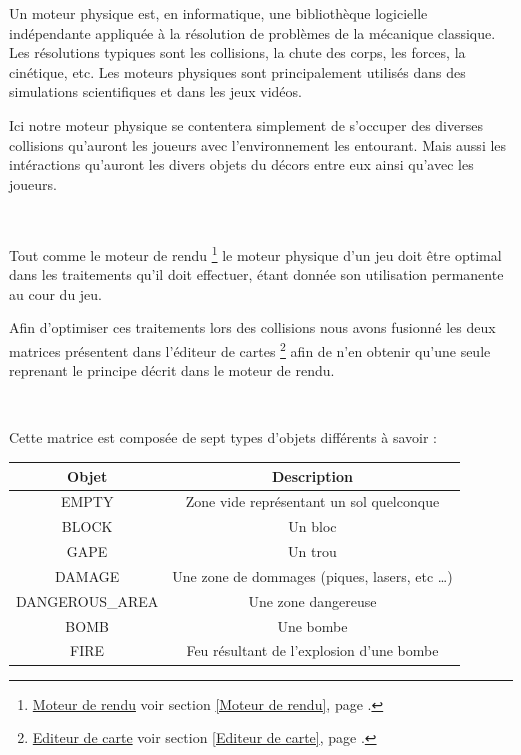 			\hypertarget{Moteur physique}{}
			\label{Moteur physique}
			
			Un moteur physique est, en informatique, une bibliothèque logicielle 
			indépendante appliquée à la résolution de problèmes de la mécanique
			classique.  Les résolutions typiques sont les collisions, la chute des corps,
			les forces, la cinétique, etc.
			Les moteurs physiques sont principalement utilisés dans des simulations 
			scientifiques et dans les jeux vidéos.
			
			
			Ici notre moteur physique se contentera simplement de s'occuper des diverses
			collisions qu'auront les joueurs avec l'environnement les entourant. Mais
			aussi les intéractions qu'auront les divers objets du décors entre eux
			ainsi qu'avec les joueurs.

			$\,$		
			
			Tout comme le moteur de rendu
			\footnote{
				\hyperlink{Moteur de rendu}{Moteur de rendu}
				\og voir section \ref{Moteur de rendu}, page \pageref{Moteur de rendu}.\fg
			}
			le moteur physique d'un jeu doit être optimal dans les traitements qu'il doit
			effectuer, étant donnée son utilisation permanente au cour du jeu.
			
			
			Afin d'optimiser ces traitements lors des collisions nous avons fusionné les
			deux matrices présentent dans l'éditeur de cartes
			\footnote{
				\hyperlink{Editeur de carte}{Editeur de carte}
				\og voir section \ref{Editeur de carte}, page \pageref{Editeur de carte}.\fg
			}
			afin de n'en obtenir qu'une seule reprenant le principe décrit dans le moteur
			de rendu\footnotemark[2].
			
			$\,$
			
			Cette matrice est composée de sept types d'objets différents à savoir :
			
			\begin{center}
				\begin{tabular}{|c|c|} \hline
				Objet  & Description \\\hline
				EMPTY  & Zone vide représentant un sol quelconque\\\hline
				BLOCK  & Un bloc \\\hline
				GAPE   & Un trou \\\hline
				DAMAGE & Une zone de dommages (piques, lasers, etc \ldots) \\\hline
				DANGEROUS\_AREA & Une zone dangereuse\\\hline
				BOMB & Une bombe\\\hline
				FIRE & Feu résultant de l'explosion d'une bombe\\\hline
				\end{tabular}
			\end{center}
			
